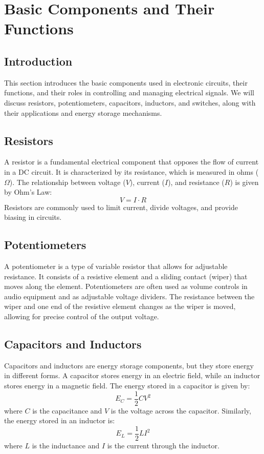 \section{Basic Components and Their Functions}
\label{section:basic_components}

\subsection*{Introduction}
This section introduces the basic components used in electronic circuits, their functions, and their roles in controlling and managing electrical signals. We will discuss resistors, potentiometers, capacitors, inductors, and switches, along with their applications and energy storage mechanisms.

\subsection*{Resistors}
A resistor is a fundamental electrical component that opposes the flow of current in a DC circuit. It is characterized by its resistance, which is measured in ohms ($\Omega$). The relationship between voltage ($V$), current ($I$), and resistance ($R$) is given by Ohm's Law:
\begin{equation}
    V = I \cdot R
\end{equation}
Resistors are commonly used to limit current, divide voltages, and provide biasing in circuits.

\subsection*{Potentiometers}
A potentiometer is a type of variable resistor that allows for adjustable resistance. It consists of a resistive element and a sliding contact (wiper) that moves along the element. Potentiometers are often used as volume controls in audio equipment and as adjustable voltage dividers. The resistance between the wiper and one end of the resistive element changes as the wiper is moved, allowing for precise control of the output voltage.

\subsection*{Capacitors and Inductors}
Capacitors and inductors are energy storage components, but they store energy in different forms. A capacitor stores energy in an electric field, while an inductor stores energy in a magnetic field. The energy stored in a capacitor is given by:
\begin{equation}
    E_C = \frac{1}{2} C V^2
\end{equation}
where $C$ is the capacitance and $V$ is the voltage across the capacitor. Similarly, the energy stored in an inductor is:
\begin{equation}
    E_L = \frac{1}{2} L I^2
\end{equation}
where $L$ is the inductance and $I$ is the current through the inductor.


